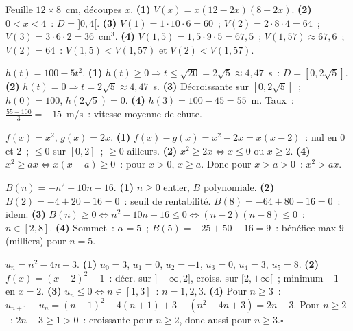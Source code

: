 
Feuille $12\times8$~cm, d\'ecoupes $x$.
\textbf{(1)} $V(x)=x(12-2x)(8-2x)$.
\textbf{(2)} $0<x<4$~: $D=]0,4[$.
\textbf{(3)} $V(1)=1\cdot10\cdot6=60$~; $V(2)=2\cdot8\cdot4=64$~; $V(3)=3\cdot6\cdot2=36$~cm$^3$.
\textbf{(4)} $V(1{,}5)=1{,}5\cdot9\cdot5=67{,}5$~; $V(1{,}57)\approx67{,}6$~; $V(2)=64$~:
$V(1{,}5)<V(1{,}57)$ et $V(2)<V(1{,}57)$.\checkmark


$h(t)=100-5t^2$.
\textbf{(1)} $h(t)\geq0\Rightarrow t\leq\sqrt{20}=2\sqrt{5}\approx4{,}47$~s~: $D=[0,2\sqrt{5}]$.
\textbf{(2)} $h(t)=0\Rightarrow t=2\sqrt{5}\approx4{,}47$~s.
\textbf{(3)} D\'ecroissante sur $[0,2\sqrt{5}]$~; $h(0)=100$, $h(2\sqrt{5})=0$.
\textbf{(4)} $h(3)=100-45=55$~m. Taux~: $\frac{55-100}{3}=-15$~m/s~: vitesse moyenne de chute.


$f(x)=x^2$, $g(x)=2x$.
\textbf{(1)} $f(x)-g(x)=x^2-2x=x(x-2)$~: nul en $0$ et $2$~; $\leq0$ sur $[0,2]$~; $\geq0$ ailleurs.
\textbf{(2)} $x^2\geq2x\Leftrightarrow x\leq0$ ou $x\geq2$.
\textbf{(4)} $x^2\geq ax\Leftrightarrow x(x-a)\geq0$~: pour $x>0$, $x\geq a$.
Donc pour $x>a>0$~: $x^2>ax$.


$B(n)=-n^2+10n-16$.
\textbf{(1)} $n\geq0$ entier, $B$ polynomiale.
\textbf{(2)} $B(2)=-4+20-16=0$~: seuil de rentabilit\'e. $B(8)=-64+80-16=0$~: idem.
\textbf{(3)} $B(n)\geq0\Leftrightarrow n^2-10n+16\leq0\Leftrightarrow(n-2)(n-8)\leq0$~: $n\in[2,8]$.
\textbf{(4)} Sommet~: $\alpha=5$~; $B(5)=-25+50-16=9$~: b\'en\'efice max $9$ (milliers) pour $n=5$.


$u_n=n^2-4n+3$.
\textbf{(1)} $u_0=3$, $u_1=0$, $u_2=-1$, $u_3=0$, $u_4=3$, $u_5=8$.
\textbf{(2)} $f(x)=(x-2)^2-1$~: d\'ecr. sur $]-\infty,2]$, croiss. sur $[2,+\infty[$~; minimum $-1$ en $x=2$.
\textbf{(3)} $u_n\leq0\Leftrightarrow n\in[1,3]$~: $n=1,2,3$.
\textbf{(4)} Pour $n\geq3$~: $u_{n+1}-u_n=(n+1)^2-4(n+1)+3-(n^2-4n+3)=2n-3$.
Pour $n\geq2$~: $2n-3\geq1>0$~: croissante pour $n\geq2$, donc aussi pour $n\geq3$.\hfill$\square$

